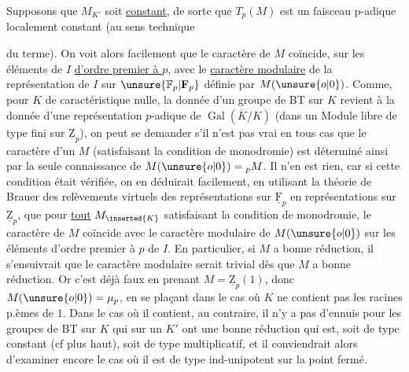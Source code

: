 Supposons que $M_{K'}$ soit \uline{constant}, de sorte que  $T_p(M)$ est un faisceau p-adique localement constant (au sens technique

du terme). On voit alors facilement que le caractère de $M$ coïncide, sur les éléments de $I$ \uline{d'ordre premier à $p$}, avec le \uline{caractère modulaire} de la représentation de $I$  sur $\unsure{\mathbb F_p|\mathbf F_p}$ définie par $M(\unsure{o|0})$. Comme, pour $K$ de caractéristique nulle, la donnée d'un groupe de BT sur $K$ revient à la donnée d'une représentation $p$-adique de $\operatorname{Gal}(\overline K/K)$ (dans un Module libre de type fini sur $\underline{\mathrm Z}_p$), on peut se demander  s'il n'est pas vrai en tous cas que le caractère d'un $M$ (satisfaisant la condition de monodromie) est déterminé ainsi par la seule connaissance de $M(\unsure{o|0})={}_pM$. Il n'en est rien, car si cette condition était vérifiée, on en déduirait facilement, en utilisant la théorie de Brauer des relèvements virtuels des représentations sur $\underline{\mathrm F}_p$ en représentations sur  $\underline{\mathrm Z}_p$, que pour \uline{tout} $M_{\inserted{K}}$ satisfaisant la condition de monodromie, le caractère de $M$ coïncide avec le caractère modulaire de $M(\unsure{o|0})$ sur les éléments d'ordre premier à $p$ de $I$. En particulier, si $M$ a bonne réduction, il s'ensuivrait que le caractère modulaire  serait trivial dès que $M$ a bonne réduction. Or c'est déjà faux en prenant $M=\underline{\mathrm Z}_p(1)$, donc $M(\unsure{o|0})=\mu_p$,  en se plaçant dans le cas où $K$ ne contient pas les racines p.èmes de $1$. Dans le cas où il  contient, au contraire, il n'y a pas d'ennuis pour les groupes de BT sur $K$ qui sur un $K'$ ont une bonne réduction qui est, soit de type constant (cf plus haut), soit de type multiplicatif, et il conviendrait alors d'examiner encore le cas où il est de type ind-unipotent sur la  point fermé.


